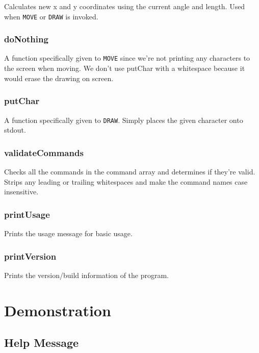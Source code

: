 \documentclass[a4paper, 12pt, titlepage]{article}
\newcommand{\code}[1]{\small\texttt{#1}\normalsize}
\begin{document}
Calculates new x and y coordinates using the current angle and length.
Used when \code{MOVE} or \code{DRAW} is invoked.

\subsubsection{doNothing}

A function specifically given to \code{MOVE} since we're not printing any 
characters to the screen when moving. We don't use putChar with a whitespace 
because it would erase the drawing on screen.

\subsubsection{putChar}

A function specifically given to \code{DRAW}. Simply places the given 
character onto stdout.

\subsubsection{validateCommands}

Checks all the commands in the command array and determines if they're valid.
Strips any leading or trailing whitespaces and make the command names case 
insensitive.

\subsubsection{printUsage}

Prints the usage message for basic usage.

\subsubsection{printVersion}

Prints the version/build information of the program.


\newpage


\section{Demonstration}

\subsection{Help Message}
\end{document}
